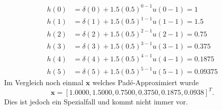 \begin{beispiel}
\begin{enumerate}
\begin{align*}
h(0)&=\delta(0)+1.5(0.5)^{0-1} u(0-1)=1\\
h(1)&=\delta(1)+1.5(0.5)^{1-1} u(1-1)=1.5\\
h(2)&=\delta(2)+1.5(0.5)^{2-1} u(2-1)=0.75\\
h(3)&=\delta(3)+1.5(0.5)^{3-1} u(3-1)=0.375\\
h(4)&=\delta(4)+1.5(0.5)^{4-1} u(4-1)=0.1875\\
h(5)&=\delta(5)+1.5(0.5)^{5-1} u(5-1)=0.09375
\end{align*}
Im Vergleich noch einmal $\bm x$ welches Padé-Approximiert wurde
\begin{equation*}
\bm x=[1.0000 , 1.5000, 0.7500 , 0.3750 , 0.1875, 0.0938]^{T}.
\end{equation*}
Dies ist jedoch ein Spezialfall und kommt nicht immer vor.
\qedhere
\end{enumerate}
\end{beispiel}






